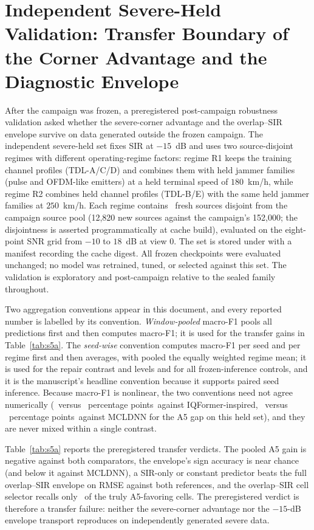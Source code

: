 \documentclass[letterpaper,onecolumn,11pt,journal]{IEEEtran}
\newcommand{\pp}{percentage points}
\begin{document}
\section{Independent Severe-Held Validation: Transfer Boundary of the Corner
Advantage and the Diagnostic Envelope}
\label{sec:transfer}
After the campaign was frozen, a preregistered post-campaign robustness
validation asked whether the severe-corner advantage and the overlap--SIR
envelope survive on data generated outside the frozen campaign. The
independent severe-held set fixes SIR at $-15$~dB and uses two
source-disjoint regimes with different operating-regime factors: regime R1
keeps the training channel profiles (TDL-A/C/D) and combines them with held
jammer families (pulse and OFDM-like emitters) at a held terminal speed of
$180$~km/h, while regime R2 combines held channel profiles (TDL-B/E) with the
same held jammer families at $250$~km/h. Each regime contains
\SevereHeldSourcesPerRegime\ fresh sources disjoint from the campaign source
pool (12,820 new sources against the campaign's 152,000; the disjointness is
asserted programmatically at cache build), evaluated on the eight-point SNR
grid from $-10$ to $18$~dB at view $0$. The set is stored under
 with a manifest recording the
cache digest. All frozen checkpoints were evaluated unchanged; no model was
retrained, tuned, or selected against this set. The validation is
exploratory and post-campaign relative to the sealed family throughout.

Two aggregation conventions appear in this document, and every reported
number is labelled by its convention. \emph{Window-pooled} macro-F1 pools all
predictions first and then computes macro-F1; it is used for the transfer
gains in Table~\ref{tab:s5a}. The \emph{seed-wise} convention computes
macro-F1 per seed and per regime first and then averages, with pooled the
equally weighted regime mean; it is used for the repair contrast and levels
and for all frozen-inference controls, and it is the manuscript's headline
convention because it supports paired seed inference. Because macro-F1 is
nonlinear, the two conventions need not agree numerically
(\SevereTransferGainIqformer\ versus \SevereSeedMeanGapIqformer\ \pp\
against IQFormer-inspired, \SevereTransferGainMcldnn\ versus
\SevereSeedMeanGapMcldnn\ \pp\ against MCLDNN for the A5 gap on this held
set), and they are never mixed within a single contrast.

Table~\ref{tab:s5a} reports the preregistered transfer verdicts. The pooled
A5 gain is negative against both comparators, the envelope's sign accuracy
is near chance (and below it against MCLDNN), a SIR-only or constant
predictor beats the full overlap--SIR envelope on RMSE against both
references, and the overlap--SIR cell selector recalls only
\SevereTransferSelectorRecall\ of the truly A5-favoring cells. The
preregistered verdict is therefore a transfer failure: neither the
severe-corner advantage nor the $-15$-dB envelope transport reproduces on
independently generated severe data.
\end{document}
